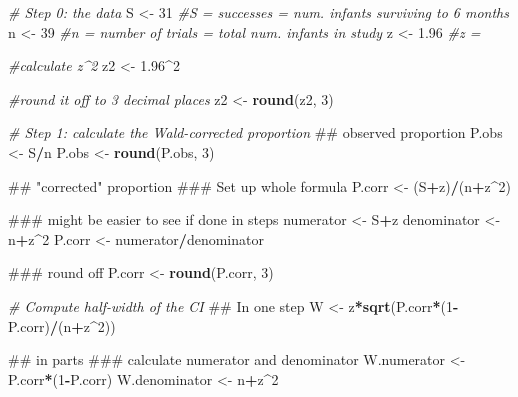 \documentclass[]{book}
\newenvironment{Shaded}{\begin{snugshade}}{\end{snugshade}}
\newcommand{\KeywordTok}[1]{\textcolor[rgb]{0.13,0.29,0.53}{\textbf{#1}}}
\newcommand{\DecValTok}[1]{\textcolor[rgb]{0.00,0.00,0.81}{#1}}
\newcommand{\FloatTok}[1]{\textcolor[rgb]{0.00,0.00,0.81}{#1}}
\newcommand{\StringTok}[1]{\textcolor[rgb]{0.31,0.60,0.02}{#1}}
\newcommand{\CommentTok}[1]{\textcolor[rgb]{0.56,0.35,0.01}{\textit{#1}}}
\newcommand{\OperatorTok}[1]{\textcolor[rgb]{0.81,0.36,0.00}{\textbf{#1}}}
\newcommand{\NormalTok}[1]{#1}
\theoremstyle{definition}
\theoremstyle{definition}
\theoremstyle{definition}
\theoremstyle{remark}
\begin{document}
\begin{Shaded}
\begin{Highlighting}[]
\CommentTok{# Step 0: the data}
\NormalTok{S <-}\StringTok{ }\DecValTok{31}   \CommentTok{#S = successes = num. infants surviving to 6 months}
\NormalTok{n <-}\StringTok{ }\DecValTok{39}   \CommentTok{#n = number of trials = total num. infants in study}
\NormalTok{z <-}\StringTok{ }\FloatTok{1.96} \CommentTok{#z = }

\CommentTok{#calculate z^2}
\NormalTok{z2 <-}\StringTok{ }\FloatTok{1.96}\OperatorTok{^}\DecValTok{2}

\CommentTok{#round it off to 3 decimal places}
\NormalTok{z2 <-}\StringTok{ }\KeywordTok{round}\NormalTok{(z2, }\DecValTok{3}\NormalTok{)}

\CommentTok{# Step 1: calculate the Wald-corrected proportion}
\NormalTok{## observed proportion}
\NormalTok{P.obs  <-}\StringTok{ }\NormalTok{S}\OperatorTok{/}\NormalTok{n}
\NormalTok{P.obs  <-}\StringTok{  }\KeywordTok{round}\NormalTok{(P.obs, }\DecValTok{3}\NormalTok{)           }

\NormalTok{## "corrected" proportion}
\NormalTok{### Set up whole formula}
\NormalTok{P.corr <-}\StringTok{  }\NormalTok{(S}\OperatorTok{+}\NormalTok{z)}\OperatorTok{/}\NormalTok{(n}\OperatorTok{+}\NormalTok{z}\OperatorTok{^}\DecValTok{2}\NormalTok{)}

\NormalTok{### might be easier to see if done in steps}
\NormalTok{numerator <-}\StringTok{ }\NormalTok{S}\OperatorTok{+}\NormalTok{z}
\NormalTok{denominator <-}\StringTok{ }\NormalTok{n}\OperatorTok{+}\NormalTok{z}\OperatorTok{^}\DecValTok{2}
\NormalTok{P.corr <-}\StringTok{ }\NormalTok{numerator}\OperatorTok{/}\NormalTok{denominator}

\NormalTok{### round off}
\NormalTok{P.corr <-}\StringTok{ }\KeywordTok{round}\NormalTok{(P.corr, }\DecValTok{3}\NormalTok{)}

\CommentTok{# Compute half-width of the CI}
\NormalTok{## In one step}
\NormalTok{W <-}\StringTok{ }\NormalTok{z}\OperatorTok{*}\KeywordTok{sqrt}\NormalTok{(P.corr}\OperatorTok{*}\NormalTok{(}\DecValTok{1}\OperatorTok{-}\NormalTok{P.corr)}\OperatorTok{/}\NormalTok{(n}\OperatorTok{+}\NormalTok{z}\OperatorTok{^}\DecValTok{2}\NormalTok{))}

\NormalTok{## in parts}
\NormalTok{### calculate numerator and denominator}
\NormalTok{W.numerator   <-}\StringTok{ }\NormalTok{P.corr}\OperatorTok{*}\NormalTok{(}\DecValTok{1}\OperatorTok{-}\NormalTok{P.corr)}
\NormalTok{W.denominator <-}\StringTok{ }\NormalTok{n}\OperatorTok{+}\NormalTok{z}\OperatorTok{^}\DecValTok{2}


\end{Highlighting}
\end{Shaded}
\end{document}
